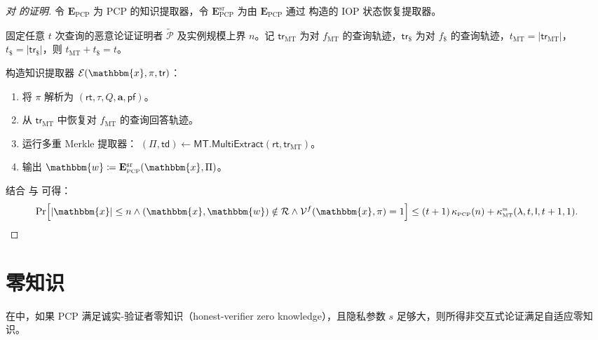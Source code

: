 \documentclass[american,singlepageview]{snargs-book-zh}
\newcommand{\Malicious}[1]{\tilde{#1}}
\newcommand{\DefineEqual}{\coloneqq}
\renewcommand{\vec}[1]{\bm{#1}}
\newcommand{\SomeSize}[1]{|#1|}
\newcommand{\Relation}{\mathcal{R}}
\newcommand{\Instance}{\mathbbm{x}}
\newcommand{\Witness}{\mathbbm{w}}
\newcommand{\InstanceSize}{n}
\newcommand{\ProtoProver}{P}
\newcommand{\ProtoVerifier}{V}
\newcommand{\ProtoExtractor}{E}
\newcommand{\ProtoSalt}{\tau}
\newcommand{\ProtoKnowledgeError}{\kappa}
\newcommand{\ProtoProofLength}{\mathsf{l}}
\newcommand{\SRSuperscript}{\mathrm{sr}}
\newcommand{\PCPSubscript}{\scriptscriptstyle\mathrm{PCP}}
\newcommand{\PCPFormat}[1]{\mathbf{#1}}
\newcommand{\PCPExtractor}{\PCPFormat{\ProtoExtractor}_{\PCPSubscript}}
\newcommand{\PCPString}{\Pi}
\newcommand{\PCPEntry}{a}
\newcommand{\PCPEntries}{\vec{\PCPEntry}}
\newcommand{\PCPQuerySet}{Q}
\newcommand{\PCPKnowledgeError}{\ProtoKnowledgeError_{\PCPSubscript}}
\newcommand{\PCPProofLength}{\ProtoProofLength}
\newcommand{\ARGFormat}[1]{\mathcal{#1}}
\newcommand{\ARGProver}{\ARGFormat{\ProtoProver}}
\newcommand{\ARGVerifier}{\ARGFormat{\ProtoVerifier}}
\newcommand{\ARGExtractor}{\ARGFormat{\ProtoExtractor}}
\newcommand{\ARGString}{\pi}
\newcommand{\ROFunction}{f}
\newcommand{\ROQueryBound}{t}
\newcommand{\SecurityParameter}{\lambda}
\newcommand{\PrivacyParameter}{s}
\newcommand{\ROTrace}{\mathsf{tr}}
\newcommand{\RORandTrace}{\ROTrace_{\RORandSymbol}}
\newcommand{\ROTreeTrace}{\ROTrace_{\ROTreeSymbol}}
\newcommand{\ROTreeSymbol}{\MTSubscript}
\newcommand{\RORandSymbol}{\scriptscriptstyle \mathsf{\$}}
\newcommand{\ROTreeFunction}{\ROFunction_{\ROTreeSymbol}}
\newcommand{\RORandFunction}{\ROFunction_{\RORandSymbol}}
\newcommand{\ROTreeQueryBound}{\ROQueryBound_{\ROTreeSymbol}}
\newcommand{\RORandQueryBound}{\ROQueryBound_{\RORandSymbol}}
\newcommand{\MTSymbol}{\mathsf{MT}}
\newcommand{\MTSubscript}{{\scriptscriptstyle\mathrm{MT}}}
\newcommand{\MTMultiExtractor}{\MTSymbol.\mathsf{MultiExtract}}
\newcommand{\MTCommitment}{\mathsf{rt}}
\newcommand{\MTTrapdoor}{\mathsf{td}}
\newcommand{\MTProof}{\mathsf{pf}}
\newcommand{\MTMultiSymbol}{\scriptscriptstyle{\mathrm{m}}}
\newcommand{\MTMultiExtractionError}{\ProtoKnowledgeError_{\MTSubscript}^{\MTMultiSymbol}}
\newcommand{\RandSaltString}{\ProtoSalt}
\newcommand{\PCPSRExtractor}{\PCPExtractor^{\SRSuperscript}}
\begin{document}
\begin{proof}[对  的证明]
令 $\PCPExtractor$ 为 PCP 的知识提取器，令 $\PCPSRExtractor$ 为由 $\PCPExtractor$ 通过  构造的 IOP 状态恢复提取器。

固定任意 $\ROQueryBound$ 次查询的恶意论证证明者 $\Malicious{\ARGProver}$ 及实例规模上界 $\InstanceSize$。记 $\ROTreeTrace$ 为对 $\ROTreeFunction$ 的查询轨迹，$\RORandTrace$ 为对 $\RORandFunction$ 的查询轨迹，$\ROTreeQueryBound=\lvert\ROTreeTrace\rvert$，$\RORandQueryBound=\lvert\RORandTrace\rvert$，则
$\ROTreeQueryBound+\RORandQueryBound=\ROQueryBound$。

构造知识提取器 $\ARGExtractor(\Instance,\ARGString,\ROTrace)$：
\begin{enumerate}[nolistsep]
  \item 将 $\ARGString$ 解析为 $(\MTCommitment,\RandSaltString,\PCPQuerySet,\PCPEntries,\MTProof)$。
  \item 从 $\ROTreeTrace$ 中恢复对 $\ROTreeFunction$ 的查询回答轨迹。
  \item 运行多重 Merkle 提取器：
    \((\PCPString,\MTTrapdoor)\gets\MTMultiExtractor(\MTCommitment,\ROTreeTrace)\)。
  \item 输出 $\Witness\DefineEqual\PCPSRExtractor(\Instance,\PCPString)$。
\end{enumerate}

结合  与  可得：
\[
  \Pr\Bigl[
    \SomeSize{\Instance}\le\InstanceSize
    \land(\Instance,\Witness)\notin\Relation
    \land\ARGVerifier^{\ROFunction}(\Instance,\ARGString)=1
  \Bigr]
  \le
  (\ROQueryBound+1)\,\PCPKnowledgeError(\InstanceSize)
  +
  \MTMultiExtractionError(\SecurityParameter,\ROQueryBound,\PCPProofLength,\ROQueryBound+1,1).
\]
\end{proof}

\section{零知识}
\label{section:micali-zero-knowledge}

在中，如果 PCP 满足诚实-验证者零知识（honest-verifier zero knowledge），且隐私参数 $\PrivacyParameter$ 足够大，则所得非交互式论证满足自适应零知识。
\end{document}
